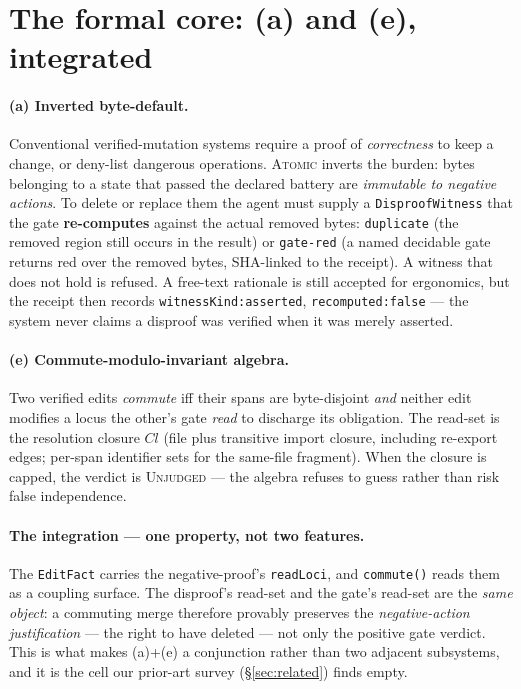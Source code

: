 
\section{The formal core: (a) and (e), integrated}\label{sec:core}

\paragraph{(a) Inverted byte-default.} Conventional verified-mutation systems
require a proof of \emph{correctness} to keep a change, or deny-list dangerous
operations. \textsc{Atomic} inverts the burden: bytes belonging to a state that
passed the declared battery are \emph{immutable to negative actions}. To delete
or replace them the agent must supply a \texttt{DisproofWitness} that the gate
\textbf{re-computes} against the actual removed bytes: \texttt{duplicate} (the
removed region still occurs in the result) or \texttt{gate-red} (a named
decidable gate returns red over the removed bytes, SHA-linked to the receipt).
A witness that does not hold is refused. A free-text rationale is still accepted
for ergonomics, but the receipt then records \texttt{witnessKind:asserted},
\texttt{recomputed:false} --- the system never claims a disproof was verified
when it was merely asserted.

\paragraph{(e) Commute-modulo-invariant algebra.} Two verified edits
\emph{commute} iff their spans are byte-disjoint \emph{and} neither edit modifies
a locus the other's gate \emph{read} to discharge its obligation. The read-set is
the resolution closure $\mathit{Cl}$ (file plus transitive import closure,
including re-export edges; per-span identifier sets for the same-file fragment).
When the closure is capped, the verdict is \textsc{Unjudged} --- the algebra
refuses to guess rather than risk false independence.

\paragraph{The integration --- one property, not two features.} The
\texttt{EditFact} carries the negative-proof's \texttt{readLoci}, and
\texttt{commute()} reads them as a coupling surface. The disproof's read-set and
the gate's read-set are the \emph{same object}: a commuting merge therefore
provably preserves the \emph{negative-action justification} --- the right to have
deleted --- not only the positive gate verdict. This is what makes (a)+(e) a
conjunction rather than two adjacent subsystems, and it is the cell our prior-art
survey (\S\ref{sec:related}) finds empty.

